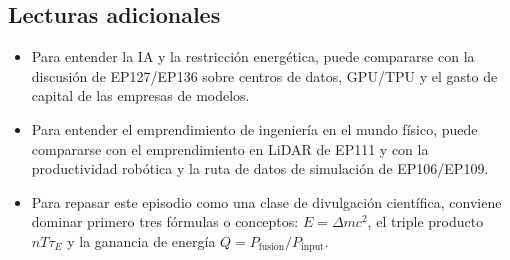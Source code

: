 \subsection{Lecturas adicionales}

\begin{itemize}
\item Para entender la IA y la restricción energética, puede compararse con la discusión de EP127/EP136 sobre centros de datos, GPU/TPU y el gasto de capital de las empresas de modelos.
\item Para entender el emprendimiento de ingeniería en el mundo físico, puede compararse con el emprendimiento en LiDAR de EP111 y con la productividad robótica y la ruta de datos de simulación de EP106/EP109.
\item Para repasar este episodio como una clase de divulgación científica, conviene dominar primero tres fórmulas o conceptos: $E=\Delta mc^2$, el triple producto $nT\tau_E$ y la ganancia de energía $Q=P_{\mathrm{fusion}}/P_{\mathrm{input}}$.
\end{itemize}


